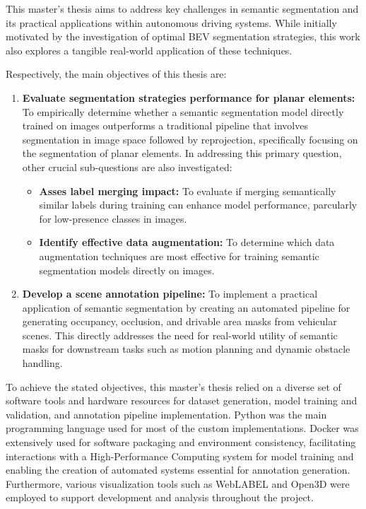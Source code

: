 
This master's thesis aims to address key challenges in  semantic segmentation and its practical applications within autonomous driving systems. While initially motivated by the investigation of optimal BEV segmentation strategies, this work also explores a tangible real-world application of these techniques.

Respectively, the main objectives of this thesis are:

\begin{enumerate}
    \item \textbf{Evaluate  segmentation strategies performance for planar elements:} To empirically determine whether a semantic segmentation model directly trained on  images outperforms a traditional pipeline that involves segmentation in image space followed by  reprojection, specifically focusing on the segmentation of planar elements. In addressing this primary question, other crucial sub-questions are also investigated:
        \begin{itemize}
            \item \textbf{Asses label merging impact:} To evaluate if merging semantically similar labels during training can enhance model performance, parcularly for low-presence classes in  images.
            \item \textbf{Identify effective data augmentation:} To determine which data augmentation techniques are most effective for training semantic segmentation models directly on  images.
        \end{itemize}
    \item \textbf{Develop a  scene annotation pipeline:} To implement a practical application of  semantic segmentation by creating an automated pipeline for generating occupancy, occlusion, and drivable area masks from vehicular scenes. This directly addresses the need for real-world utility of  semantic masks for downstream tasks such as motion planning and dynamic obstacle handling.
\end{enumerate}

To achieve the stated objectives, this master's thesis relied on a diverse set of software tools and hardware resources for dataset generation, model training and validation, and annotation pipeline implementation. Python was the main programming language used for most of the custom implementations. Docker was extensively used for software packaging and environment consistency, facilitating interactions with a High-Performance Computing system for model training and enabling the creation of automated systems essential for annotation generation. Furthermore, various visualization tools such as WebLABEL and Open3D were employed to support development and analysis throughout the project.

